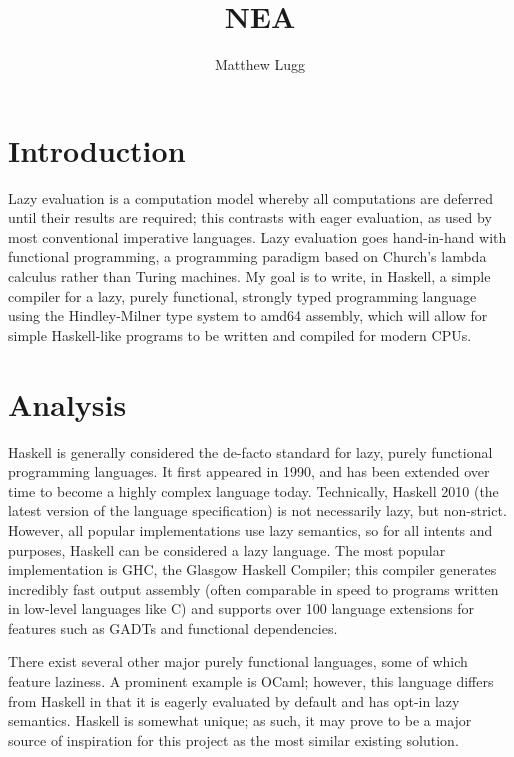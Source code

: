 \documentclass[9pt]{extarticle}
\title{NEA}
\author{Matthew Lugg}
\begin{document}
\maketitle

\newpage

\tableofcontents

\newpage

\section{Introduction}

Lazy evaluation is a computation model whereby all computations are deferred
until their results are required; this contrasts with eager evaluation, as used
by most conventional imperative languages. Lazy evaluation goes hand-in-hand
with functional programming, a programming paradigm based on Church's lambda
calculus rather than Turing machines. My goal is to write, in Haskell, a simple
compiler for a lazy, purely functional, strongly typed programming language
using the Hindley-Milner type system to amd64 assembly, which will allow for
simple Haskell-like programs to be written and compiled for modern CPUs.

\section{Analysis}

Haskell is generally considered the de-facto standard for lazy, purely
functional programming languages. It first appeared in 1990, and has been
extended over time to become a highly complex language today. Technically,
Haskell 2010 (the latest version of the language specification) is not
necessarily lazy, but non-strict. However, all popular implementations use lazy
semantics, so for all intents and purposes, Haskell can be considered a lazy
language. The most popular implementation is GHC, the Glasgow Haskell Compiler;
this compiler generates incredibly fast output assembly (often comparable in
speed to programs written in low-level languages like C) and supports over 100
language extensions for features such as GADTs and functional dependencies. 

There exist several other major purely functional languages, some of which
feature laziness. A prominent example is OCaml; however, this language differs
from Haskell in that it is eagerly evaluated by default and has opt-in lazy
semantics. Haskell is somewhat unique; as such, it may prove to be a major
source of inspiration for this project as the most similar existing solution. 
\end{document}

